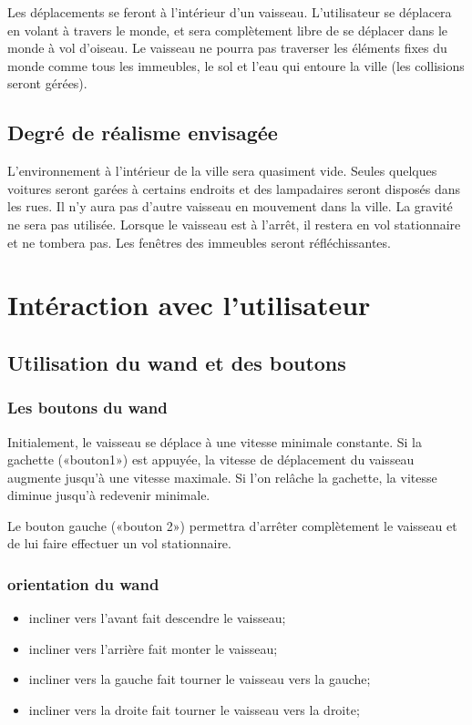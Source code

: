 \documentclass[a4paper,12pt]{article}
\begin{document}
Les déplacements se feront à l'intérieur d'un vaisseau. L'utilisateur se déplacera en volant à travers le monde, et sera complètement libre de se déplacer dans le monde à vol d'oiseau. 
Le vaisseau ne pourra pas traverser les éléments fixes du monde comme tous les immeubles, le sol et l'eau qui entoure la ville (les collisions seront gérées).
 
\subsection{Degré de réalisme envisagée}

L'environnement à l'intérieur de la ville sera quasiment vide. Seules quelques voitures seront garées à certains endroits et des lampadaires seront disposés dans les rues. Il n'y aura pas d'autre vaisseau en mouvement dans la ville. La gravité ne sera pas utilisée. Lorsque le vaisseau est à l'arrêt, il restera en vol stationnaire et ne tombera pas. Les fenêtres des immeubles seront réfléchissantes.
 
\section{Intéraction avec l'utilisateur}
\subsection{Utilisation du wand et des boutons}
\subsubsection{Les boutons du wand}
Initialement, le vaisseau se déplace à une vitesse minimale constante. Si la gachette («bouton1») est appuyée, la vitesse de déplacement du vaisseau augmente jusqu'à une vitesse maximale. Si l'on relâche la gachette, la vitesse diminue
jusqu'à redevenir minimale.

Le bouton gauche («bouton 2») permettra d'arrêter complètement le vaisseau et de lui faire effectuer un vol stationnaire.

 
\subsubsection{orientation du wand}
\begin{itemize}
\item incliner vers l'avant fait descendre le vaisseau;
\item incliner vers l'arrière fait monter le vaisseau;
\item incliner vers la gauche fait tourner le vaisseau vers la gauche;
\item incliner vers la droite fait tourner le vaisseau vers la droite;
\end{itemize}
\end{document}
